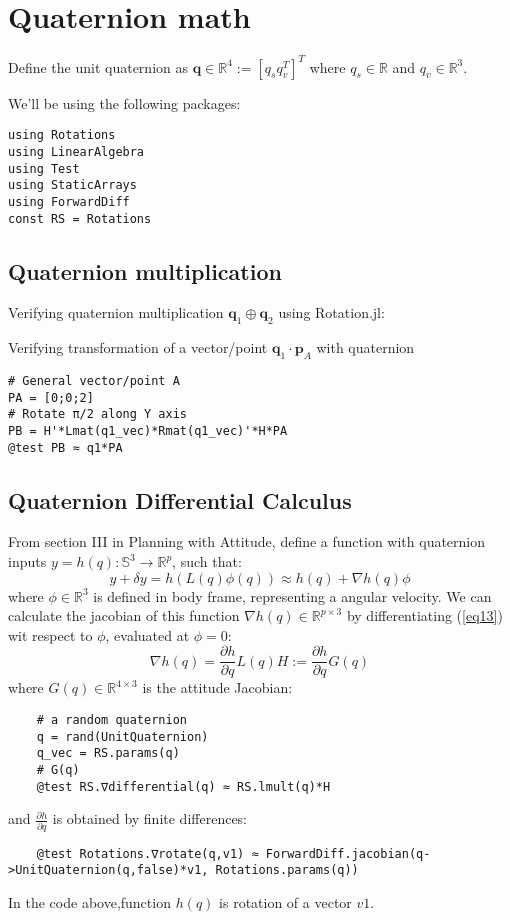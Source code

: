 \section{Quaternion math}
Define the unit quaternion as $\textbf{q} \in \mathbb{R}^4 := [q_s q_v^T]^T$ where $q_s \in \mathbb{R}$ and $q_v \in \mathbb{R}^3$.

We'll be using the following packages:
\begin{lstlisting}
using Rotations
using LinearAlgebra
using Test
using StaticArrays
using ForwardDiff
const RS = Rotations
\end{lstlisting}

\subsection{Quaternion multiplication}
Verifying quaternion multiplication $\textbf{q}_1 \oplus \textbf{q}_2$ using Rotation.jl:

Verifying transformation of a vector/point $\textbf{q}_1 \cdot \textbf{p}_A $ with quaternion
\begin{lstlisting}
# General vector/point A
PA = [0;0;2]
# Rotate π/2 along Y axis
PB = H'*Lmat(q1_vec)*Rmat(q1_vec)'*H*PA
@test PB ≈ q1*PA
\end{lstlisting}
\subsection{Quaternion Differential Calculus}
From section III in Planning with Attitude\cite{jackson2021planning},
define a function with quaternion inputs $y=h(q): \mathbb{S}^3 \rightarrow \mathbb{R}^p$, such that:
\begin{equation}
    y+\delta y = h(L(q)\phi(q)) \approx h(q) + \nabla h(q)\phi
    \label{eq13}
\end{equation}
where $\phi \in \mathbb{R}^3$ is defined in body frame, representing a angular velocity.
We can calculate the jacobian of this function $\nabla h(q) \in \mathbb{R}^{p \times 3}$ by differentiating (\ref{eq13}) wit respect to $\phi$, evaluated at $\phi = 0$:
\begin{equation}
    \nabla h(q) = \frac{\partial h}{\partial q}L(q)H := \frac{\partial h}{\partial q}G(q)
\end{equation}
where $G(q) \in \mathbb{R}^{4 \times 3}$ is the attitude Jacobian:
\begin{lstlisting}
    # a random quaternion
    q = rand(UnitQuaternion)
    q_vec = RS.params(q)
    # G(q)
    @test RS.∇differential(q) ≈ RS.lmult(q)*H
\end{lstlisting}
and $\frac{\partial h}{\partial q}$ is obtained by finite differences:
\begin{lstlisting}
    @test Rotations.∇rotate(q,v1) ≈ ForwardDiff.jacobian(q->UnitQuaternion(q,false)*v1, Rotations.params(q))
\end{lstlisting}
In the code above,function $h(q)$ is rotation of a vector $v1$.

\pagebreak